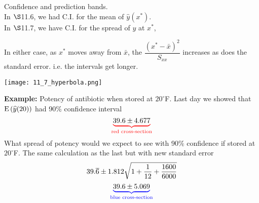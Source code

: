 \disc Confidence and prediction bands.
\\ In $\S$11.6, we had C.I. for the mean of $\widehat y (x^*)$.
\\ In $\S$11.7, we have C.I. for the spread of $y$ at $x^*$,

\nl In either case, as $x^*$ moves away from $\bar x$, the $\dfrac{(x^* - \bar x)^2}{S_{xx}}$ increases as does the standard error. i.e. the intervals get longer.

\begin{center}
    \texttt{[image: 11\_7\_hyperbola.png]}
\end{center}

\noindent \textbf{Example: } Potency of antibiotic when stored at $20^{\circ}$F. Last day we showed that $\E{\widehat y(20)}$ had 90\% confidence interval
$$\color{red} \underbrace{\color{black} 39.6 \pm 4.677}_{\text{red cross-section}}$$
What spread of potency would we expect to see with 90\% confidence if stored at $20^{\circ}$F. The same calculation as the last but with new standard error 
$$39.\overline6 \pm 1.812 \sqrt{1 + \over{12} + \frac{1600}{6000}}$$
$$\color{blue} \underbrace{\color{black} 39.6 \pm 5.069}_{\text{blue cross-section}}$$


